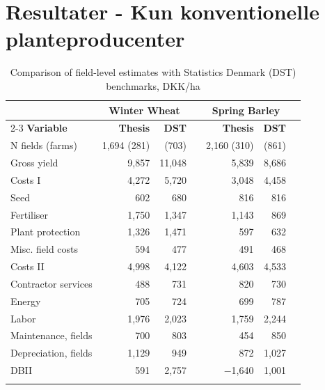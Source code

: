 \documentclass[12pt]{article}
\begin{document}
\section{Resultater - Kun konventionelle planteproducenter}






\begin{table}[htbp]
\centering
\small
\caption{Comparison of field-level estimates with Statistics Denmark (DST) benchmarks, DKK/ha}
\label{tab:dst-comparison}
\begin{threeparttable}
\begin{tabular}{lrrrrrr}
\toprule
 & \multicolumn{2}{c}{\textbf{Winter Wheat}} & & \multicolumn{2}{c}{\textbf{Spring Barley}} \\
\cmidrule{2-3} \cmidrule{5-6}
\textbf{Variable} & \textbf{Thesis} & \textbf{DST} & & \textbf{Thesis} & \textbf{DST} \\
\midrule
\addlinespace
N fields (farms)             & 1,694 (281) & (703) & & 2,160 (310) & (861) \\
\addlinespace
Gross yield                  &  9,857 & 11,048 & &  5,839 &  8,686 \\
\addlinespace
Costs I                      &  4,272 &  5,720 & &  3,048 &  4,458 \\
Seed                   &    602 &    680 & &    816 &    816 \\
Fertiliser             &  1,750 &  1,347 & &  1,143 &    869 \\
Plant protection       &  1,326 &  1,471 & &    597 &    632 \\
Misc. field costs      &    594 &    477 & &    491 &    468 \\
\addlinespace
Costs II                     &  4,998 &  4,122 & &  4,603 &  4,533 \\
Contractor services    &    488 &    731 & &    820 &    730 \\
Energy     &    705 &    724 & &    699 &    787 \\
Labor                  &  1,976 &  2,023 & &  1,759 &  2,244 \\
Maintenance, fields    &    700 &    803 & &    454 &    850 \\
Depreciation, fields   &  1,129 &    949 & &    872 &  1,027 \\
\addlinespace
DBII                &    591 &  2,757 & & $-$1,640 &  1,001 \\
\addlinespace
\bottomrule
\end{tabular}

\end{threeparttable}
\end{table}
\end{document}
